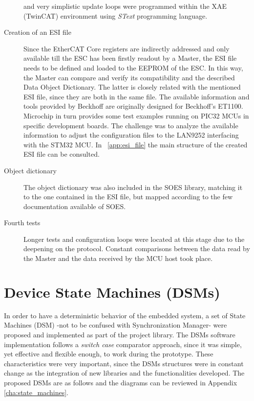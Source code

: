 \begin{description}
      and very simplistic update loops were programmed within the XAE (TwinCAT) environment using \emph{SText} programming language.
\item[Creation of an ESI file] Since the EtherCAT Core registers are indirectly addressed and only available till the ESC has been firstly readout by a 
      Master, the ESI file needs to be defined and loaded to the EEPROM of the ESC. In this way, the Master can compare and verify its compatibility and 
      the described Data Object Dictionary. The latter is closely related with the mentioned ESI file, since they are both in the same file. 
      The available information and tools provided by Beckhoff are originally designed for Beckhoff's ET1100. Microchip in turn provides some test
      examples running on PIC32 MCUs in specific development boards. The challenge was to analyze the available information to adjust the configuration
      files to the LAN9252 interfacing with the STM32 MCU. In ~\ref{app:esi_file} the main structure of the created ESI file can be consulted.
\item[Object dictionary] The object dictionary was also included in the SOES library, matching it to the one contained in the ESI file, but mapped 
    according to the few documentation available of SOES.
\item[Fourth tests] Longer tests and configuration loops were located at this stage due to the deepening on the protocol. 
Constant comparisons between the data read by the Master and the data received by the MCU host took place.
\end{description}


\section{Device State Machines (DSMs)}\label{sec:statemachines}


In order to have a deterministic behavior of the embedded system, a set of State Machines (DSM) -not to be confused with Synchronization Manager- 
were proposed and implemented as part of the project library. 
The DSMs software implementation follows a \emph{switch case} comparator approach, since it was simple, yet effective and flexible enough, 
to work during the prototype. 
These characteristics were very important, since the DSMs structures were in constant change as the integration of new libraries 
and the functionalities developed. 
The proposed DSMs are as follows and the diagrams can be reviewed in Appendix \ref{cha:state_machines}.

